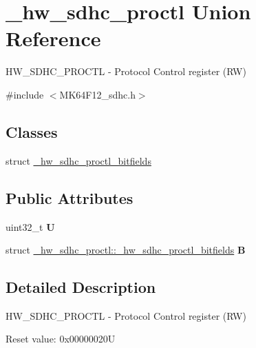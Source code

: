 \hypertarget{union__hw__sdhc__proctl}{}\section{\+\_\+hw\+\_\+sdhc\+\_\+proctl Union Reference}
\label{union__hw__sdhc__proctl}


H\+W\+\_\+\+S\+D\+H\+C\+\_\+\+P\+R\+O\+C\+TL -\/ Protocol Control register (RW)  




{\ttfamily \#include $<$M\+K64\+F12\+\_\+sdhc.\+h$>$}

\subsection*{Classes}
\begin{DoxyCompactItemize}
\item 
struct \hyperlink{struct__hw__sdhc__proctl_1_1__hw__sdhc__proctl__bitfields}{\+\_\+hw\+\_\+sdhc\+\_\+proctl\+\_\+bitfields}
\end{DoxyCompactItemize}
\subsection*{Public Attributes}
\begin{DoxyCompactItemize}
\item 
uint32\+\_\+t {\bfseries U}\hypertarget{union__hw__sdhc__proctl_a6a39c55623f11d98a29f721cd5216c53}{}\label{union__hw__sdhc__proctl_a6a39c55623f11d98a29f721cd5216c53}

\item 
struct \hyperlink{struct__hw__sdhc__proctl_1_1__hw__sdhc__proctl__bitfields}{\+\_\+hw\+\_\+sdhc\+\_\+proctl\+::\+\_\+hw\+\_\+sdhc\+\_\+proctl\+\_\+bitfields} {\bfseries B}\hypertarget{union__hw__sdhc__proctl_a026bb334a891d6c7c447830e5560801d}{}\label{union__hw__sdhc__proctl_a026bb334a891d6c7c447830e5560801d}

\end{DoxyCompactItemize}


\subsection{Detailed Description}
H\+W\+\_\+\+S\+D\+H\+C\+\_\+\+P\+R\+O\+C\+TL -\/ Protocol Control register (RW) 

Reset value\+: 0x00000020U

